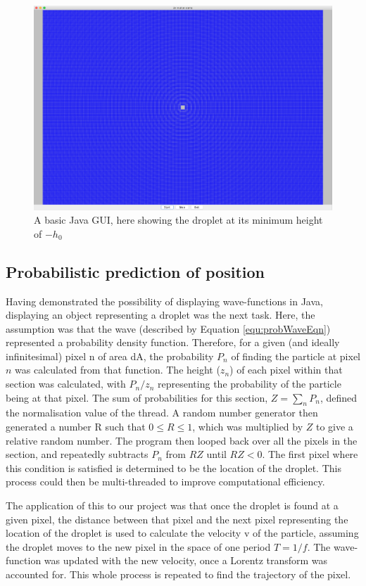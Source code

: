 \begin{figure}
    \centering
    \includegraphics[width=\textwidth]{simulation/javaMaxHeight.png}
    \caption{A basic Java GUI, here showing the droplet at its minimum height of $-h_0$}
    \label{fig:javaBasicHeight}
\end{figure}

\subsection{Probabilistic prediction of position}
Having demonstrated the possibility of displaying wave-functions in Java, displaying an object representing a droplet was the next task. Here, the assumption was that the wave (described by Equation \ref{equ:probWaveEqn}) represented a probability density function. Therefore, for a given (and ideally infinitesimal) pixel n of area dA, the probability $P_n$ of finding the particle at pixel $n$ was calculated from that function. The height ($z_n$) of each pixel within that section was calculated, with ${P_n}/{z_n}$ representing the probability of the particle being at that pixel. The sum of probabilities for this section, $Z=\sum_n{P_n}$, defined the normalisation value of the thread. A random number generator then generated a number R such that $0\leq R \leq 1$, which was multiplied by $Z$ to give a relative random number. The program then looped back over all the pixels in the section, and repeatedly subtracts $P_n$ from $RZ$ until $RZ<0$. The first pixel where this condition is satisfied is determined to be the location of the droplet. This process could then be multi-threaded to improve computational efficiency.

The application of this to our project was that once the droplet is found at a given pixel, the distance between that pixel and the next pixel representing the location of the droplet is used to calculate the velocity v of the particle, assuming the droplet moves to the new pixel in the space of one period $T=1/f$. The wave-function was updated with the new velocity, once a Lorentz transform was accounted for. This whole process is repeated to find the trajectory of the pixel.

